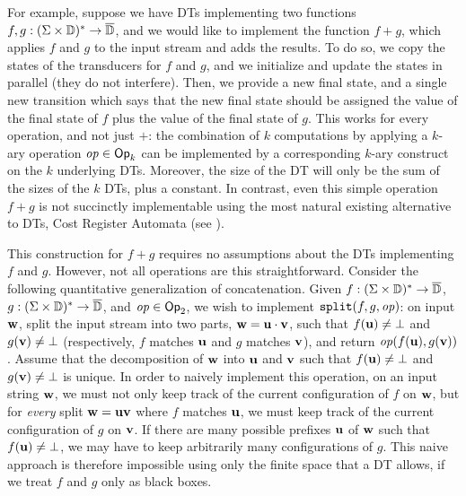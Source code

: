 For example, suppose we have DTs implementing two functions $f, g: (\Sigma \times \mathbb{D})^{*} \to \overline{\mathbb{D}{}}$, and we would like to implement the function $f + g$, which applies $f$ and $g$ to the input stream and adds the results.
To do so, we copy the states of the transducers for $f$ and $g$,
and we initialize and update the states in parallel (they do not interfere).
Then, we provide a new final state, and a single new transition which says that the new final state should be assigned the value of the final state of $f$ plus the value of the final state of $g$.
This works for every operation, and not just $+$: the combination of $k$ computations by applying a $k$-ary operation $\mathit{op} \in \textsf{Op}_k$ can be implemented by a corresponding $k$-ary construct on the $k$ underlying DTs. Moreover, the size of the DT will only be the sum of the sizes of the $k$ DTs, plus a constant.
In contrast, even this simple operation $f+g$ is not succinctly implementable using the most natural existing alternative to DTs, Cost Register Automata (see ).

This construction for $f+g$ requires no assumptions about the DTs implementing $f$ and $g$.
However, not all operations are this straightforward.
Consider the following quantitative generalization of concatenation. Given $f: (\Sigma \times \mathbb{D})^{*} \to \overline{\mathbb{D}{}}$, $g: (\Sigma \times \mathbb{D})^{*} \to \overline{\mathbb{D}{}}$, and $\mathit{op} \in \textsf{Op}_2$, we wish to implement $\texttt{split}(f,g,\mathit{op})$:
on input $\mathbf{w}$, split the input stream into two parts, $\mathbf{w} = \mathbf{u} \cdot \mathbf{v}$, such that $f(\mathbf{u}) \ne \bot$ and $g(\mathbf{v}) \ne \bot$ (respectively, $f$ matches $\mathbf{u}$ and $g$ matches $\mathbf{v}$), and return $\mathit{op}(f(\mathbf{u}),g(\mathbf{v}))$. Assume that the decomposition of $\mathbf{w}$ into $\mathbf{u}$ and $\mathbf{v}$ such that $f(\mathbf{u}) \ne \bot$ and $g(\mathbf{v}) \ne \bot$ is unique.
In order to naively implement this operation, on an input string $\mathbf{w}$, we must not only keep track of the current
configuration of $f$ on $\mathbf{w}$,
but for \emph{every} split $\mathbf{w} = \mathbf{u} \mathbf{v}$ where $f$ matches $\mathbf{u}$,
we must keep track of the current configuration of $g$ on $\mathbf{v}$.
If there are many possible prefixes $\mathbf{u}$ of $\mathbf{w}$ such that $f(\mathbf{u}) \ne \bot$, we may have to keep arbitrarily many configurations of $g$. This naive approach is therefore impossible using only the finite space that a DT allows, if we treat $f$ and $g$ only as black boxes.

